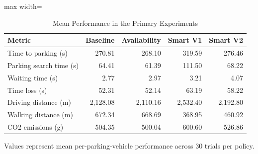 \begin{table}[t]
\centering
\caption{Mean Performance in the Primary Experiments}
\label{tab:primary_performance}
\small
\setlength{\tabcolsep}{4pt}
\begin{adjustbox}{max width=\textwidth}

\begin{tabular}{lrrrr}
\toprule
Metric & Baseline & Availability & Smart V1 & Smart V2\\
\midrule
Time to parking (s) & 270.81 & 268.10 & 319.59 & 276.46\\
Parking search time (s) & 64.41 & 61.39 & 111.50 & 68.22\\
Waiting time (s) & 2.77 & 2.97 & 3.21 & 4.07\\
Time loss (s) & 52.31 & 52.14 & 63.19 & 58.22\\
Driving distance (m) & 2,128.08 & 2,110.16 & 2,532.40 & 2,192.80\\
\addlinespace
Walking distance (m) & 672.34 & 668.69 & 368.95 & 460.92\\
CO2 emissions (g) & 504.35 & 500.04 & 600.60 & 526.86\\
\bottomrule
\end{tabular}
\end{adjustbox}
\par\smallskip
\begin{minipage}{\textwidth}
\footnotesize
Values represent mean per-parking-vehicle performance across 30 trials per policy.
\end{minipage}
\end{table}
